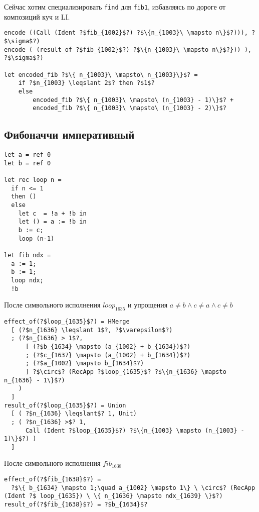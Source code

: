 \documentclass{article}
\begin{document}
Сейчас хотим специализировать \texttt{find} для \texttt{fib1}, избавляясь по дороге от композиций куч и LI.

\begin{verbatim}
encode ((Call (Ident ?$fib_{1002}$?) ?$\{n_{1003}\ \mapsto n\}$?))), ?$\sigma$?)
encode ( (result_of ?$fib_{1002}$?) ?$\{n_{1003}\ \mapsto n\}$?})) ), ?$\sigma$?)

let encoded_fib ?$\{ n_{1003}\ \mapsto\ n_{1003}\}$? = 
    if ?$n_{1003} \leqslant 2$? then ?$1$?
    else 
        encoded_fib ?$\{ n_{1003}\ \mapsto\ (n_{1003} - 1)\}$? +  
        encoded_fib ?$\{ n_{1003}\ \mapsto\ (n_{1003} - 2)\}$?
\end{verbatim}


% 
% 
% 

\subsection{Фибоначчи императивный}
\begin{verbatim}  
let a = ref 0
let b = ref 0

let rec loop n = 
  if n <= 1
  then ()
  else 
    let c  = !a + !b in 
    let () = a := !b in
    b := c;
    loop (n-1) 
 
let fib ndx = 
  a := 1;
  b := 1;
  loop ndx;
  !b
\end{verbatim}
После символьного исполнения $loop_{1635}$ и упрощения $a \neq b \wedge c \neq a \wedge c \neq b$
\begin{verbatim}
effect_of(?$loop_{1635}$?) = HMerge 
  [ (?$n_{1636} \leqslant 1$?, ?$\varepsilon$?)
  ; (?$n_{1636} > 1$?,
      [ (?$b_{1634} \mapsto (a_{1002} + b_{1634})$?)
      ; (?$c_{1637} \mapsto (a_{1002} + b_{1634})$?)
      ; (?$a_{1002} \mapsto b_{1634}$?)          
      ] ?$\circ$? (RecApp ?$loop_{1635}$? ?$\{n_{1636} \mapsto n_{1636} - 1\}$?)
    )
  ]
result_of(?$loop_{1635}$?) = Union 
  [ ( ?$n_{1636} \leqslant$? 1, Unit)     
  ; ( ?$n_{1636} >$? 1,
      Call (Ident ?$loop_{1635}$?) ?$\{n_{1003} \mapsto (n_{1003} - 1)\}$?) )
  ]
\end{verbatim}
После символьного исполнения $fib_{1638}$
\begin{verbatim}
effect_of(?$fib_{1638}$?) = 
  ?$\{ b_{1634} \mapsto 1;\quad a_{1002} \mapsto 1\} \ \circ$? (RecApp (Ident ?$ loop_{1635}) \ \{ n_{1636} \mapsto ndx_{1639} \}$?)
result_of(?$fib_{1638}$?) = ?$b_{1634}$? 
\end{verbatim}
\end{document}
